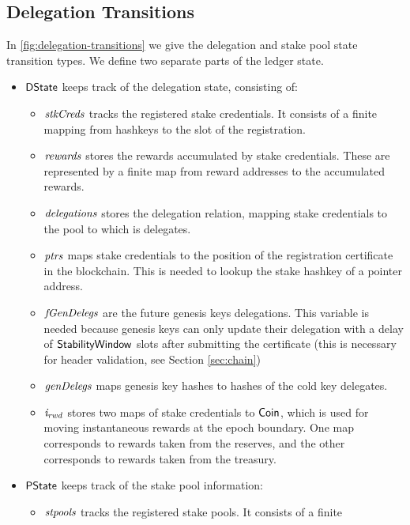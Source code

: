\subsection{Delegation Transitions}
\label{sec:deleg-trans}


In \cref{fig:delegation-transitions} we give the delegation and stake pool
state transition types. We define two separate parts of the ledger state.

\begin{itemize}
  \item $\mathsf{DState}$ keeps track of the delegation state, consisting of:
    \begin{itemize}
    \item $\mathit{stkCreds}$ tracks the registered stake credentials. It consists
      of a finite mapping from hashkeys to the slot of the registration.
    \item $\mathit{rewards}$ stores the rewards accumulated by stake credentials.
      These are represented by a finite map from reward addresses to the
      accumulated rewards.
    \item $\mathit{delegations}$ stores the delegation relation, mapping stake
      credentials to the pool to which is delegates.
    \item $\mathit{ptrs}$ maps stake credentials to the position of the
      registration certificate in the blockchain. This is needed to lookup the
      stake hashkey of a pointer address.
      \item $\mathit{fGenDelegs}$ are the future genesis keys delegations. This variable
      is needed because genesis keys can only update their delegation with a
      delay of $\mathsf{StabilityWindow}$ slots after submitting the certificate (this is
      necessary for header validation, see Section \ref{sec:chain})
      \item $\mathit{genDelegs}$ maps genesis key hashes to hashes of the cold key
        delegates.
      \item $\mathit{i_{rwd}}$ stores two maps of stake credentials to $\mathsf{Coin}$,
        which is used for moving instantaneous rewards at the epoch boundary.
        One map corresponds to rewards taken from the reserves,
        and the other corresponds to rewards taken from the treasury.
    \end{itemize}
  \item $\mathsf{PState}$ keeps track of the stake pool information:
    \begin{itemize}
      \item $\mathit{stpools}$ tracks the registered stake pools. It consists of a finite

\end{itemize}
\end{itemize}
